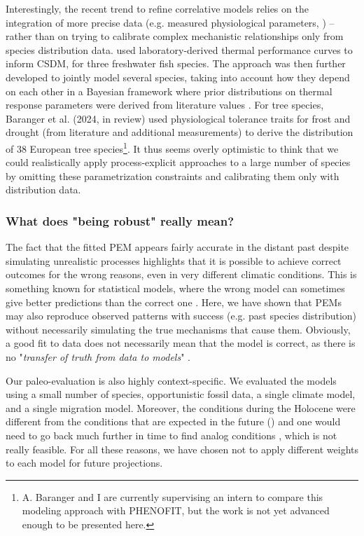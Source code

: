 Interestingly, the recent trend to refine correlative models relies on the integration of more precise data (e.g. measured physiological parameters, \citealp{Kuo2022}) -- rather than on trying to calibrate complex mechanistic relationships only from species distribution data. \citet{Wagner2023} used laboratory-derived thermal performance curves to inform CSDM, for three freshwater fish species. The approach was then further developed to jointly model several species, taking into account how they depend on each other in a Bayesian framework where 
prior distributions on thermal response parameters were derived from literature values \citep{Custer2024}. For tree species, {\color{um-red} Baranger et al.} ({\color{um-red}2024}, in review) used physiological tolerance traits for frost and drought (from literature and additional measurements) to derive the distribution of 38 European tree species\footnote{A. Baranger and I are currently supervising an intern to compare this modeling approach with PHENOFIT, but the work is not yet advanced enough to be presented here.}. It thus seems overly optimistic to think that we could realistically apply process-explicit approaches to a large number of species by omitting these parametrization constraints and calibrating them only with distribution data.

\subsubsection{What does "being robust" really mean?}

The fact that the fitted PEM appears fairly accurate in the distant past despite simulating unrealistic processes highlights that it is possible to achieve correct outcomes for the wrong reasons, even in very different climatic conditions. This is something known for statistical models, where the wrong model can sometimes give better predictions than the correct one \citep{Hagerty1991, Shmueli2010}. Here, we have shown that PEMs may also reproduce observed patterns with success (e.g. past species distribution) without necessarily simulating the true mechanisms that cause them. Obviously, a good fit to data does not necessarily mean that the model is correct, as there is no "\emph{transfer of truth from data to models}" \citep{Gramelsberger2020}.

Our paleo-evaluation is also highly context-specific. We evaluated the models using a small number of species, opportunistic fossil data, a single climate model, and a single migration model. Moreover, the conditions during the Holocene were different from the conditions that are expected in the future () and one would need to go back much further in time to find analog conditions \citep{Burke2018, Tierney2020}, which is not really feasible. For all these reasons, we have chosen not to apply different weights to each model for future projections.  

